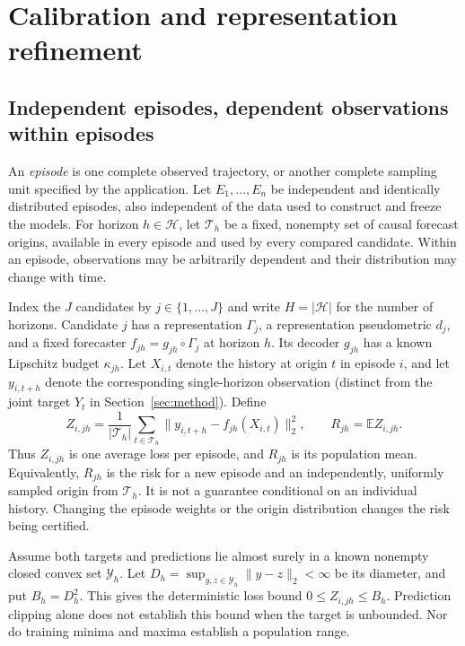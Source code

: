 \section{Calibration and representation refinement}
\label{sec:calibration}

\subsection{Independent episodes, dependent observations within episodes}

An \emph{episode} is one complete observed trajectory, or another complete
sampling unit specified by the application. Let $E_1,\ldots,E_n$ be
independent and identically distributed episodes, also independent of the
data used to construct and freeze the models. For horizon $h\in\mathcal H$,
let $\mathcal T_h$ be a fixed, nonempty set of causal forecast origins,
available in every episode and used by every compared candidate. Within an
episode, observations may be arbitrarily dependent and their distribution
may change with time.

Index the $J$ candidates by $j\in\{1,\ldots,J\}$ and write
$H=|\mathcal H|$ for the number of horizons. Candidate $j$ has a
representation $\Gamma_j$, a representation pseudometric $d_j$, and a
fixed forecaster $f_{jh}=g_{jh}\circ\Gamma_j$ at horizon $h$. Its decoder
$g_{jh}$ has a known Lipschitz budget $\kappa_{jh}$. Let $X_{i,t}$ denote
the history at origin $t$ in episode $i$, and let $y_{i,t+h}$ denote the
corresponding single-horizon observation (distinct from the joint target
$Y_t$ in Section~\ref{sec:method}). Define
\begin{equation}
 Z_{i,jh}=\frac1{|\mathcal T_h|}\sum_{t\in\mathcal T_h}
       \|y_{i,t+h}-f_{jh}(X_{i,t})\|_2^2,
 \qquad R_{jh}=\mathbb E Z_{i,jh}.
 \label{eq:episode-risk}
\end{equation}
Thus $Z_{i,jh}$ is one average loss per episode, and $R_{jh}$ is its
population mean. Equivalently, $R_{jh}$ is the risk for a new episode and
an independently, uniformly sampled origin from $\mathcal T_h$. It is not
a guarantee conditional on an individual history. Changing the episode
weights or the origin distribution changes the risk being certified.

Assume both targets and predictions lie almost surely in a known nonempty
closed convex set $\mathcal Y_h$. Let
$D_h=\sup_{y,z\in\mathcal Y_h}\|y-z\|_2<\infty$ be its diameter, and
put $B_h=D_h^2$. This gives the deterministic loss bound
$0\leq Z_{i,jh}\leq B_h$. Prediction clipping alone does not establish
this bound when the target is unbounded. Nor do training minima and maxima
establish a population range.

